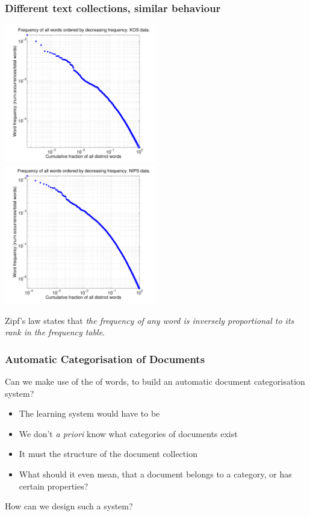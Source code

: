 \begin{frame}
\frametitle{Different text collections, similar behaviour}

\centerline{
\includegraphics[width=0.5\textwidth]{kos_loglog_freqs}
\includegraphics[width=0.5\textwidth]{nips_loglog_freqs}
}

Zipf's law states that \emph{the frequency of any word is inversely proportional 
to its rank in the frequency table}.
\end{frame}


\begin{frame}
\frametitle{Automatic Categorisation of Documents}

Can we make use of the  of words, to
build an automatic document categorisation system?

\begin{itemize}
\item The learning system would have to be 
\item We don't \emph{a priori} know what categories of documents exist
\item It must  the structure of
  the document collection
\item What should it even mean, that a document belongs to a category, or
  has certain properties?
\end{itemize} 

How can we design such a system?
\end{frame}

